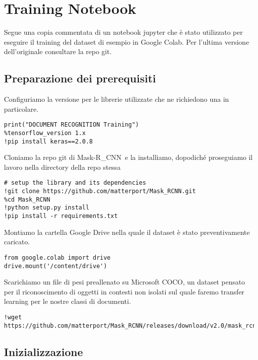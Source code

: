 \documentclass[12pt,a4paper]{article}
\newcommand{\mrcnn}{Mask-R\_CNN}
\begin{document}
\pagebreak

\section{Training Notebook} %

Segue una copia commentata di un notebook jupyter che è stato utilizzato
per eseguire il training del dataset di esempio in Google Colab. Per
l'ultima versione dell'originale consultare la repo git.

\subsection{Preparazione dei prerequisiti}

Configuriamo la versione per le librerie utilizzate che ne richiedono
una in particolare.

\begin{verbatim}
print("DOCUMENT RECOGNITION Training")
%tensorflow_version 1.x
!pip install keras==2.0.8
\end{verbatim}

Cloniamo la repo git di \mrcnn\ e la installiamo, dopodiché proseguiamo
il lavoro nella directory della repo stessa

\begin{verbatim}
# setup the library and its dependencies
!git clone https://github.com/matterport/Mask_RCNN.git
%cd Mask_RCNN
!python setup.py install
!pip install -r requirements.txt
\end{verbatim}

Montiamo la cartella Google Drive nella quale il dataset è stato
preventivamente caricato.

\begin{verbatim}
from google.colab import drive
drive.mount('/content/drive')
\end{verbatim}

Scarichiamo un file di pesi preallenato su Microsoft COCO, un dataset
pensato per il riconoscimento di oggetti in contesti non isolati sul
quale faremo transfer learning per le nostre classi di documenti.

\begin{verbatim}
!wget https://github.com/matterport/Mask_RCNN/releases/download/v2.0/mask_rcnn_coco.h5
\end{verbatim}

\subsection{Inizializzazione}
\end{document}
